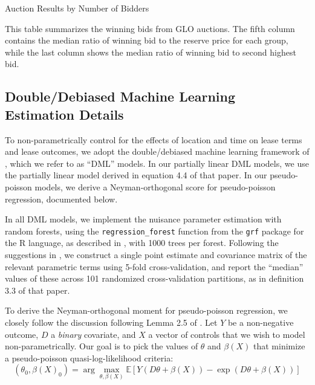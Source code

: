 \documentclass[12pt]{article}
\begin{document}
\begin{appendices}
\begin{table}[H]
\begin{center}
\begin{threeparttable}
	\caption{Auction Results by Number of Bidders}
	\label{tab:AuctionNBids}
 	\small
   	            
    \footnotesize
    \begin{tablenotes}
    	\item This table summarizes the winning bids from GLO auctions. The fifth column contains the median ratio of winning bid to the reserve price for each group, while the last column shows the median ratio of winning bid to second highest bid.
    \end{tablenotes}
\end{threeparttable}
\end{center}
\end{table}

\subsection{Double/Debiased Machine Learning Estimation Details}\label{sec:dml}
To non-parametrically control for the effects of location and time on lease terms and lease outcomes, we adopt the double/debiased machine learning framework of \cite{chernozhukov2018double}, which we refer to as ``DML'' models.  In our partially linear DML models, we use the partially linear model derived in equation 4.4 of that paper.  In our pseudo-poisson models, we derive a Neyman-orthogonal score for pseudo-poisson regression, documented below.  

In all DML models, we implement the nuisance parameter estimation with random forests, using the \texttt{regression\_forest} function from the \texttt{grf} package for the R language, as described in \cite{athey2019generalized}, with 1000 trees per forest.  Following the suggestions in \cite{chernozhukov2018double}, we construct a single point estimate and covariance matrix of the relevant parametric terms using 5-fold cross-validation, and report the ``median'' values of these across 101 randomized cross-validation partitions, as in definition 3.3 of that paper. 

To derive the Neyman-orthogonal moment for pseudo-poisson regression, we closely follow the discussion following Lemma 2.5 of \cite{chernozhukov2018double}.  Let $Y$ be a non-negative outcome, $D$ a \textit{binary} covariate, and $X$ a vector of controls that we wish to model non-parametrically.  Our goal is to pick the values of $\theta$ and $\beta(X)$ that minimize a pseudo-poisson quasi-log-likelihood criteria:
\begin{equation*}
	(\theta_0, \beta(X)_0) = \arg \max_{\theta, \beta(X)} \mathbb{E}\left[Y(D\theta + \beta(X))-\exp(D\theta + \beta(X))\right]
\end{equation*}


\end{appendices}
\end{document}

